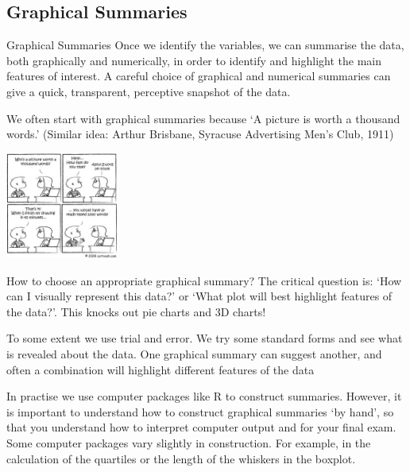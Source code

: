 \documentclass[t,xcolor=pdftex,dvipsnames,table]{beamer}\usepackage[]{graphicx}\usepackage[]{color}
\begin{document}
\subsection[]{Graphical Summaries}
\begin{frame}{Graphical Summaries}
Once we identify the variables, we can summarise the data, both graphically and numerically, in order to identify and highlight the main features of interest.   A careful choice of graphical and numerical summaries can give a quick, transparent, perceptive snapshot of the data. 

\vspace{.5cm}
We often start with graphical summaries because `A picture is worth a thousand words.' (Similar idea: Arthur Brisbane, Syracuse Advertising Men's Club, 1911)

\begin{center}
\includegraphics[height=3.5cm]{../images/PictureWords.jpg}
\end{center}
\href{www.abpublish.co.uk/blogphotos/picture_thousand_words.jpg}{}
\end{frame}


\begin{frame}{How to choose an appropriate graphical summary?}
The critical question is: `How can I visually represent this data?' or `What plot will best highlight features of the data?'. This knocks out pie charts and 3D charts!

\vspace{.5cm}
To some extent we use trial and error. We try some standard forms and see what is revealed about the data. One graphical summary can suggest another, and often a combination will highlight different features of the data

\vspace{.5cm}
In practise we use computer packages like R to construct summaries.
However, it is important to understand how to construct graphical summaries ‘by hand’, so that you understand how to interpret computer output and for your final exam. Some computer packages vary slightly in construction. For example, in the calculation of the quartiles or the length of the whiskers in the boxplot.
\end{frame}
\end{document}
